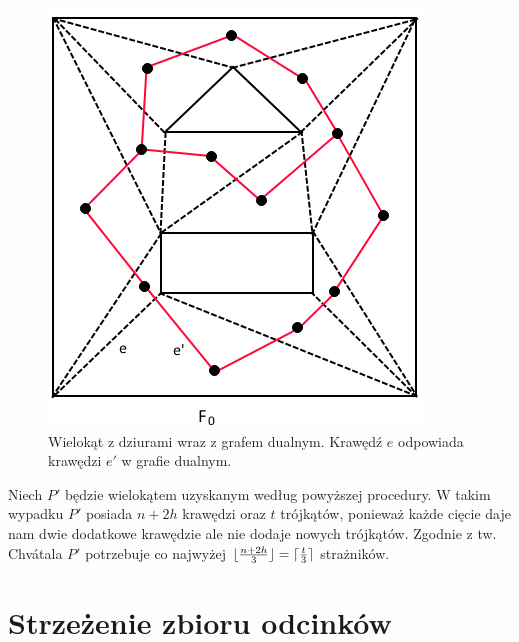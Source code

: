 \documentclass[brudnopis]{xmgr}
\DeclarePairedDelimiter\ceil{\lceil}{\rceil}
\DeclarePairedDelimiter\floor{\lfloor}{\rfloor}
\theoremstyle{definition}
\begin{document}
\begin{figure}[h!]
  \centering
    \includegraphics{rysunki/triangulacja_dziury.png}
    \caption{Wielokąt z dziurami wraz z grafem dualnym. Krawędź $e$ odpowiada krawędzi $e'$ w grafie dualnym.}
    \label{fig:triangulacja}
\end{figure} 

\indent Niech $P'$ będzie wielokątem uzyskanym według powyższej procedury. W takim wypadku $P'$ posiada $n + 2h$ krawędzi oraz $t$ trójkątów, ponieważ każde cięcie daje nam dwie dodatkowe krawędzie ale nie dodaje nowych trójkątów. Zgodnie z tw. Chv\'atala $P'$ potrzebuje co najwyżej $\floor{\frac{n+2h}{3}} = \ceil{\frac{t}{3}}$ strażników.

\chapter{Strzeżenie zbioru odcinków}
\end{document}

